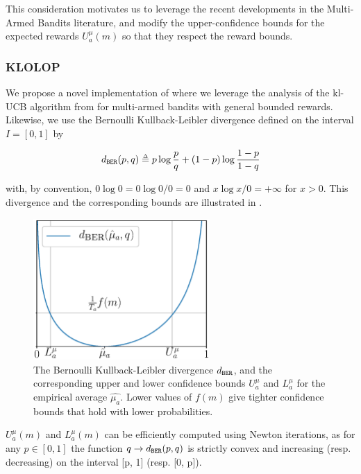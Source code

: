 This consideration motivates us to leverage the recent developments in the Multi-Armed Bandits literature, and modify the upper-confidence bounds for the expected rewards $U^\mu_a(m)$ so that they respect the reward bounds.


\subsubsection{\gls*{KLOLOP}}
\label{sec:kl-olop-kl-olop}

\noindent
We propose a novel implementation of  where we leverage the analysis of the kl-UCB algorithm from \citep{Cappe2013} for multi-armed bandits with general bounded rewards.
Likewise, we use the Bernoulli Kullback-Leibler divergence defined on the interval $I=[0,1]$ by

\begin{equation*}
\dber(p, q) \eqdef p \log \frac{p}{q} + (1-p)\log\frac{1-p}{1-q}
\end{equation*}

\noindent
with, by convention, $0 \log 0 = 0 \log 0/0 = 0$ and $x \log x /0 = +\infty$ for $x>0$.
This divergence and the corresponding bounds are illustrated in .

\begin{figure}[tp]
	\centering
	\includegraphics[width=0.6\textwidth]{img/ukl}
	\caption{The Bernoulli Kullback-Leibler divergence $d_\texttt{BER}$, and the corresponding upper and lower confidence bounds $U^{\mu}_a$ and $L^{\mu}_a$ for the empirical average $\hat{\mu_a}$. Lower values of $f(m)$ give tighter confidence bounds that hold with lower probabilities.}
	\label{fig:ukl}
\end{figure}

$U^{\mu}_a(m)$ and $L^{\mu}_a(m)$ can be efficiently computed using Newton iterations, as for any $p\in[0, 1]$ the function $q \rightarrow d_\texttt{BER}(p,q)$ is strictly convex and increasing (resp. decreasing) on the interval [p, 1] (resp. [0, p]).

